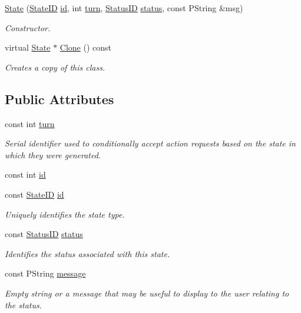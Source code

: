 \begin{CompactItemize}
\hyperlink{classState_380fc79d928e017522e3b1c91e9aa66e}{State} (\hyperlink{state_8h_2c309f64131cbfdae6d95e6591f208e6}{StateID} \hyperlink{classState_f747db9527dfb6ea0a58fe7bfeb3ac80}{id}, int \hyperlink{classState_97418aee9e2f52608a6ab606c4594aff}{turn}, \hyperlink{state_8h_26688ca6a181d6c6cf4f21d9839d4125}{StatusID} \hyperlink{classState_75d3a38b16f7081c4e961f6e7e2708b7}{status}, const PString \&msg)
\begin{CompactList}\small\item\em Constructor. \item\end{CompactList}\item 
virtual \hyperlink{classState}{State} $\ast$ \hyperlink{classState_1e0489c0ec718afbb95d43edfcdafaab}{Clone} () const 
\begin{CompactList}\small\item\em Creates a copy of this class. \item\end{CompactList}\end{CompactItemize}
\subsection*{Public Attributes}
\begin{CompactItemize}
\item 
const int \hyperlink{classState_97418aee9e2f52608a6ab606c4594aff}{turn}
\begin{CompactList}\small\item\em Serial identifier used to conditionally accept action requests based on the state in which they were generated. \item\end{CompactList}\item 
const int \hyperlink{classState_f747db9527dfb6ea0a58fe7bfeb3ac80}{id}
\item 
const \hyperlink{state_8h_2c309f64131cbfdae6d95e6591f208e6}{StateID} \hyperlink{classState_3e78ec8b6887cfe32f68049e85398a42}{id}
\begin{CompactList}\small\item\em Uniquely identifies the state type. \item\end{CompactList}\item 
const \hyperlink{state_8h_26688ca6a181d6c6cf4f21d9839d4125}{StatusID} \hyperlink{classState_75d3a38b16f7081c4e961f6e7e2708b7}{status}
\begin{CompactList}\small\item\em Identifies the status associated with this state. \item\end{CompactList}\item 
const PString \hyperlink{classState_e85e97971c5a76295158e8225e468c32}{message}
\begin{CompactList}\small\item\em Empty string or a message that may be useful to display to the user relating to the status. \item\end{CompactList}\end{CompactItemize}


